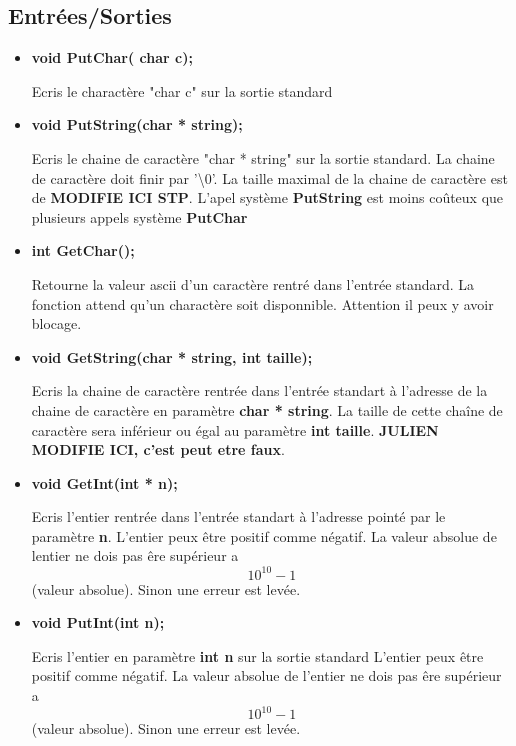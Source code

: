 \documentclass{article}
\begin{document}
\subsection{Entrées/Sorties}
\begin{itemize}
    \item 
    \textbf{void PutChar( char c);}
    
    Ecris le charactère "char c" sur la sortie standard
    
    \item 
    \textbf{void PutString(char * string);}
    
    Ecris le chaine de caractère "char * string" sur la sortie standard.
    La chaine de caractère doit finir par '\textbackslash0'.
    La taille maximal de la chaine de caractère est de 
    \textbf{ MODIFIE ICI STP}.
    L'apel système \textbf{PutString} est moins coûteux que plusieurs appels système \textbf{PutChar}
    
     \item 
    \textbf{int GetChar();}
    
    Retourne la valeur ascii d'un caractère rentré dans l'entrée standard.
    La fonction attend qu'un charactère soit disponnible. Attention il peux y avoir blocage.
    
    
     \item 
    \textbf{void GetString(char * string, int taille);}
    
    Ecris la chaine de caractère rentrée dans l'entrée standart à l'adresse de la chaine de caractère en paramètre \textbf{char * string}. La taille de cette chaîne de caractère sera inférieur ou égal au paramètre \textbf{int taille}.
    \textbf{JULIEN MODIFIE ICI, c'est peut etre faux}.
    
      \item 
    \textbf{void GetInt(int * n);}
    
    Ecris l'entier rentrée dans l'entrée standart à l'adresse pointé par le paramètre \textbf{n}.
    L'entier peux être positif comme négatif.
    La valeur absolue de lentier ne dois pas êre supérieur a \[10^{10}-1\] (valeur absolue). Sinon une erreur est levée.
    
    
    
      \item 
    \textbf{void PutInt(int n);}
    
     Ecris l'entier en paramètre \textbf{int n} sur la sortie standard
    L'entier peux être positif comme négatif.
    La valeur absolue de l'entier ne dois pas êre supérieur a \[10^{10}-1\] (valeur absolue). Sinon une erreur est levée.
    
    
\end{itemize}
\end{document}
